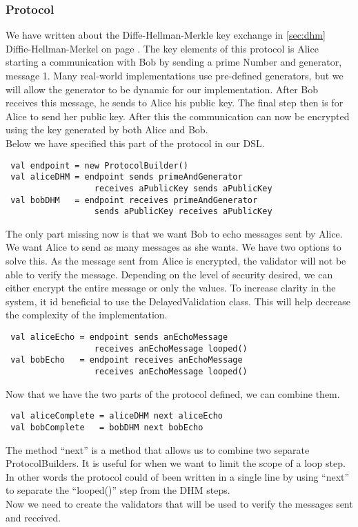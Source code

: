 \subsubsection{Protocol}
We have written about the Diffe-Hellman-Merkle key exchange in \ref{sec:dhm} Diffie-Hellman-Merkel on page \pageref{sec:dhm}. The key elements of this protocol is Alice starting a communication with Bob by sending a prime Number and generator, message 1. Many real-world implementations use pre-defined generators, but we will allow the generator to be dynamic for our implementation. After Bob receives this message, he sends to Alice his public key. The final step then is for Alice to send her public key. After this the communication can now be encrypted using the key generated by both Alice and Bob.
\\ 
Below we have specified this part of the protocol in our DSL.
\begin{lstlisting}
 val endpoint = new ProtocolBuilder()
 val aliceDHM = endpoint sends primeAndGenerator 
                  receives aPublicKey sends aPublicKey
 val bobDHM   = endpoint receives primeAndGenerator 
                  sends aPublicKey receives aPublicKey
\end{lstlisting}
The only part missing now is that we want Bob to echo messages sent by Alice. We want Alice to send as many messages as she wants. We have two options to solve this. As the message sent from Alice is encrypted, the validator will not be able to verify the message. Depending on the level of security desired, we can either encrypt the entire message or only the values. To increase clarity in the system, it id beneficial to use the DelayedValidation class. This will help decrease the complexity of the implementation.

\begin{lstlisting}
 val aliceEcho = endpoint sends anEchoMessage 
                  receives anEchoMessage looped()
 val bobEcho   = endpoint receives anEchoMessage
                  receives anEchoMessage looped()
\end{lstlisting}

Now that we have the two parts of the protocol defined, we can combine them.
\begin{lstlisting}
 val aliceComplete = aliceDHM next aliceEcho
 val bobComplete   = bobDHM next bobEcho
\end{lstlisting}
The method ``next'' is a method that allows us to combine two separate ProtocolBuilders. It is useful for when we want to limit the scope of a loop step. In other words the protocol could of been written in a single line by using ``next'' to separate the ``looped()'' step from the DHM steps.
\\
Now we need to create the validators that will be used to verify the messages sent and received.

